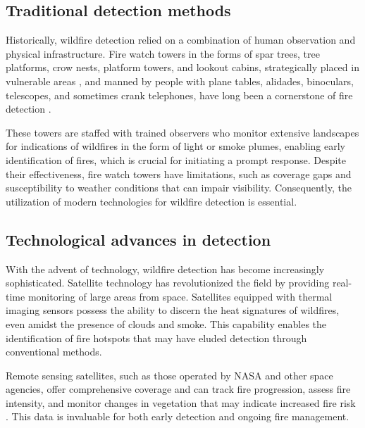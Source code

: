 \documentclass[
  12 pt,
]{Nemilov}
\begin{document}
\subsection{Traditional detection methods}\label{traditional-detection-methods}

Historically, wildfire detection relied on a combination of human observation and physical infrastructure. Fire watch towers in the forms of spar trees, tree platforms, crow nests, platform towers, and lookout cabins, strategically placed in vulnerable areas \citep{ankur2018generation}, and manned by people with plane tables, alidades, binoculars, telescopes, and sometimes crank telephones, have long been a cornerstone of fire detection \citep{berryoung2021little}.

These towers are staffed with trained observers who monitor extensive landscapes for indications of wildfires in the form of light or smoke plumes, enabling early identification of fires, which is crucial for initiating a prompt response. Despite their effectiveness, fire watch towers have limitations, such as coverage gaps and susceptibility to weather conditions that can impair visibility. Consequently, the utilization of modern technologies for wildfire detection is essential.

\subsection{Technological advances in detection}\label{technological-advances-in-detection}

With the advent of technology, wildfire detection has become increasingly sophisticated. Satellite technology has revolutionized the field by providing real-time monitoring of large areas from space. Satellites equipped with thermal imaging sensors possess the ability to discern the heat signatures of wildfires, even amidst the presence of clouds and smoke. This capability enables the identification of fire hotspots that may have eluded detection through conventional methods.

Remote sensing satellites, such as those operated by NASA and other space agencies, offer comprehensive coverage and can track fire progression, assess fire intensity, and monitor changes in vegetation that may indicate increased fire risk \citep{chuvieco2020satellite, wooster2021satellite}. This data is invaluable for both early detection and ongoing fire management.
\end{document}
